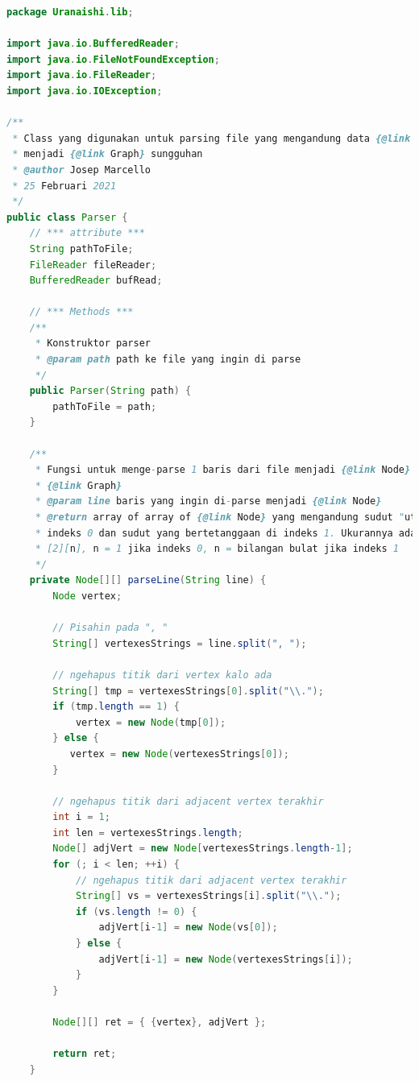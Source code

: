 \documentclass{article}
\begin{document}
\begin{lstlisting}[caption = lib/Parser.java, language = java]
package Uranaishi.lib;

import java.io.BufferedReader;
import java.io.FileNotFoundException;
import java.io.FileReader;
import java.io.IOException;

/**
 * Class yang digunakan untuk parsing file yang mengandung data {@link Graph}
 * menjadi {@link Graph} sungguhan
 * @author Josep Marcello
 * 25 Februari 2021
 */
public class Parser {
    // *** attribute ***
    String pathToFile;
    FileReader fileReader;
    BufferedReader bufRead;

    // *** Methods ***
    /**
     * Konstruktor parser
     * @param path path ke file yang ingin di parse
     */
    public Parser(String path) {
        pathToFile = path;
    }

    /**
     * Fungsi untuk menge-parse 1 baris dari file menjadi {@link Node} untuk
     * {@link Graph}
     * @param line baris yang ingin di-parse menjadi {@link Node}
     * @return array of array of {@link Node} yang mengandung sudut "utama" di
     * indeks 0 dan sudut yang bertetanggaan di indeks 1. Ukurannya adalah
     * [2][n], n = 1 jika indeks 0, n = bilangan bulat jika indeks 1
     */
    private Node[][] parseLine(String line) {
        Node vertex;

        // Pisahin pada ", "
        String[] vertexesStrings = line.split(", ");

        // ngehapus titik dari vertex kalo ada
        String[] tmp = vertexesStrings[0].split("\\.");
        if (tmp.length == 1) {
            vertex = new Node(tmp[0]);
        } else {
           vertex = new Node(vertexesStrings[0]);
        }

        // ngehapus titik dari adjacent vertex terakhir
        int i = 1;
        int len = vertexesStrings.length;
        Node[] adjVert = new Node[vertexesStrings.length-1];
        for (; i < len; ++i) {
            // ngehapus titik dari adjacent vertex terakhir
            String[] vs = vertexesStrings[i].split("\\.");
            if (vs.length != 0) {
                adjVert[i-1] = new Node(vs[0]);
            } else {
                adjVert[i-1] = new Node(vertexesStrings[i]);
            }
        }

        Node[][] ret = { {vertex}, adjVert };

        return ret;
    }


\end{lstlisting}
\end{document}
